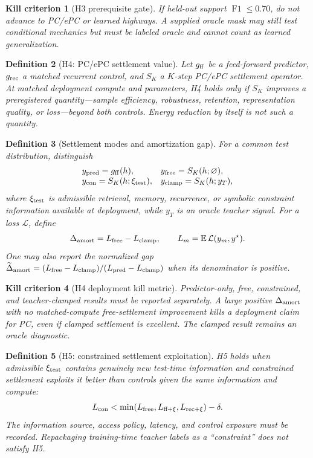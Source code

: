 \documentclass[11pt]{article}
\newtheorem{definition}{Definition}[section]
\newtheorem{criterion}[definition]{Kill criterion}
\newcommand{\Fone}{\operatorname{F1}}
\begin{document}
\begin{criterion}[H3 prerequisite gate]
If held-out support $\Fone\le0.70$, do not advance to PC/ePC or learned
highways.  A supplied oracle mask may still test conditional mechanics but
must be labeled oracle and cannot count as learned generalization.
\end{criterion}

\begin{definition}[H4: PC/ePC settlement value]
Let $g_{\rm ff}$ be a feed-forward predictor, $g_{\rm rec}$ a matched recurrent
control, and $S_K$ a $K$-step PC/ePC settlement operator.  At matched deployment
compute and parameters, H4 holds only if $S_K$ improves a preregistered
quantity---sample efficiency, robustness, retention, representation quality,
or loss---beyond both controls.  Energy reduction by itself is not such a
quantity.
\end{definition}

\begin{definition}[Settlement modes and amortization gap]
For a common test distribution, distinguish
\[
\begin{array}{ll}
y_{\rm pred}=g_{\rm ff}(h),&
y_{\rm free}=S_K(h;\varnothing),\\
y_{\rm con}=S_K(h;\xi_{\rm test}),&
y_{\rm clamp}=S_K(h;y_T),
\end{array}
\]
where $\xi_{\rm test}$ is admissible retrieval, memory, recurrence, or symbolic
constraint information available at deployment, while $y_T$ is an oracle
teacher signal.  For a loss $\mathcal L$, define
\[
 \Delta_{\rm amort}
 =L_{\rm free}-L_{\rm clamp},\qquad
 L_m=\mathbb E\,\mathcal L(y_m,y^\star).
\]
One may also report the normalized gap
$\widetilde\Delta_{\rm amort}=
(L_{\rm free}-L_{\rm clamp})/(L_{\rm pred}-L_{\rm clamp})$ when its denominator
is positive.
\end{definition}

\begin{criterion}[H4 deployment kill metric]
Predictor-only, free, constrained, and teacher-clamped results must be reported
separately.  A large positive $\Delta_{\rm amort}$ with no matched-compute
free-settlement improvement kills a deployment claim for PC, even if clamped
settlement is excellent.  The clamped result remains an oracle diagnostic.
\end{criterion}

\begin{definition}[H5: constrained settlement exploitation]
H5 holds when admissible $\xi_{\rm test}$ contains genuinely new test-time
information and constrained settlement exploits it better than controls given
the same information and compute:
\[
 L_{\rm con}<\min(L_{\rm free},L_{\rm ff+\xi},L_{\rm rec+\xi})-\delta.
\]
The information source, access policy, latency, and control exposure must be
recorded.  Repackaging training-time teacher labels as a ``constraint'' does
not satisfy H5.
\end{definition}
\end{document}
